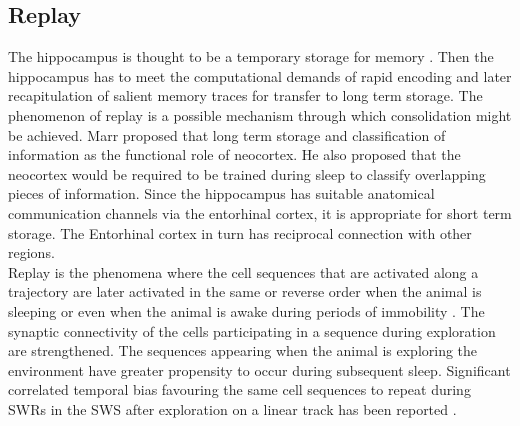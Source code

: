 \subsection{Replay}
\label{replay}
The hippocampus is thought to be a temporary storage for memory \cite{Buzsaki1989, Battaglia2011}. Then the hippocampus has to meet the computational demands of rapid encoding and later recapitulation of salient memory traces for transfer to long term storage. The phenomenon of replay is a possible mechanism through which consolidation might be achieved.  Marr \cite{Marr2007} proposed that long term storage and classification of information as the functional role of neocortex. He also proposed that the neocortex would be required to be trained during sleep to classify overlapping pieces of information. Since the hippocampus has suitable anatomical communication channels via the entorhinal cortex, it is appropriate for short term storage. The Entorhinal cortex in turn has reciprocal connection with other regions. \\

Replay is the phenomena where the cell sequences that are activated along a trajectory are later activated in the same or reverse order when the animal is sleeping or even when the animal is awake during periods of immobility . The synaptic connectivity of the cells participating in a sequence during exploration are strengthened.  The sequences appearing when the animal is exploring the environment have greater propensity to occur during subsequent sleep. Significant correlated temporal bias favouring the same cell sequences to repeat during SWRs in the SWS after exploration on a linear track has been reported \cite{Skaggs1996b}. \\





